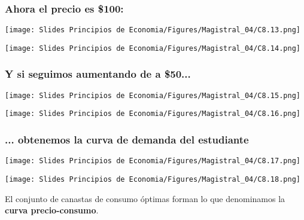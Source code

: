 \documentclass{beamer}
\begin{document}
\begin{frame}
\frametitle{Ahora el precio es \$100:}
\begin{center}
  \begin{minipage}{0.48\textwidth}
      \texttt{[image: Slides Principios de Economia/Figures/Magistral\_04/C8.13.png]}
  \end{minipage}\hfill
  \begin{minipage}{0.48\textwidth}
      \texttt{[image: Slides Principios de Economia/Figures/Magistral\_04/C8.14.png]}
  \end{minipage}
\end{center}
\end{frame}


\begin{frame}
\frametitle{Y si seguimos aumentando de a \$50...}
\begin{center}
  \begin{minipage}{0.48\textwidth}
      \texttt{[image: Slides Principios de Economia/Figures/Magistral\_04/C8.15.png]}
  \end{minipage}\hfill
  \begin{minipage}{0.48\textwidth}
      \texttt{[image: Slides Principios de Economia/Figures/Magistral\_04/C8.16.png]}
  \end{minipage}
\end{center}
\end{frame}

\begin{frame}
\frametitle{... obtenemos la curva de demanda del estudiante}
\begin{center}
  \begin{minipage}{0.48\textwidth}
      \texttt{[image: Slides Principios de Economia/Figures/Magistral\_04/C8.17.png]}
  \end{minipage}\hfill
  \begin{minipage}{0.48\textwidth}
      \texttt{[image: Slides Principios de Economia/Figures/Magistral\_04/C8.18.png]}
  \end{minipage}
\end{center}
\vspace{3mm}
El conjunto de canastas de consumo óptimas forman lo que denominamos la \textbf{curva precio-consumo}.
\end{frame}
\end{document}
